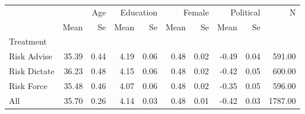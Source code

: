 \begin{tabular}{lrrrrrrrrr}
 & \multicolumn{2}{r}{Age} & \multicolumn{2}{r}{Education} & \multicolumn{2}{r}{Female} & \multicolumn{2}{r}{Political} & N \\
 & Mean & Se & Mean & Se & Mean & Se & Mean & Se &  \\
Treatment &  &  &  &  &  &  &  &  &  \\
Risk Advise & 35.39 & 0.44 & 4.19 & 0.06 & 0.48 & 0.02 & -0.49 & 0.04 & 591.00 \\
Risk Dictate & 36.23 & 0.48 & 4.15 & 0.06 & 0.48 & 0.02 & -0.42 & 0.05 & 600.00 \\
Risk Force & 35.48 & 0.46 & 4.07 & 0.06 & 0.48 & 0.02 & -0.35 & 0.05 & 596.00 \\
All & 35.70 & 0.26 & 4.14 & 0.03 & 0.48 & 0.01 & -0.42 & 0.03 & 1787.00 \\
\end{tabular}
